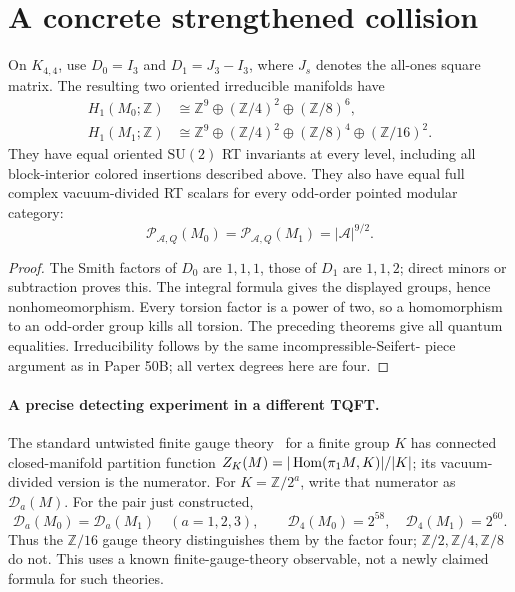 \section{A concrete strengthened collision}
\begin{corollary}
On \(K_{4,4}\), use \(D_0=I_3\) and \(D_1=J_3-I_3\), where
\(J_s\) denotes the all-ones square matrix. The resulting two
oriented irreducible manifolds have
\begin{align*}
 H_1(M_0;\mathbb Z)&\cong\mathbb Z^9\oplus(\mathbb Z/4)^2
                                  \oplus(\mathbb Z/8)^6,\\
 H_1(M_1;\mathbb Z)&\cong\mathbb Z^9\oplus(\mathbb Z/4)^2
                  \oplus(\mathbb Z/8)^4\oplus(\mathbb Z/16)^2.
\end{align*}
They have equal oriented \(\mathrm{SU}(2)\) RT invariants at every
level, including all block-interior colored insertions described above.
They also have equal full complex vacuum-divided RT scalars for every
odd-order pointed modular category:
\[
 \mathcal P_{\mathcal A,Q}(M_0)
 =\mathcal P_{\mathcal A,Q}(M_1)=|\mathcal A|^{9/2}.
\]
\end{corollary}
\begin{proof}
The Smith factors of \(D_0\) are \(1,1,1\), those of \(D_1\) are
\(1,1,2\); direct minors or subtraction proves this. The integral
formula gives the displayed groups, hence nonhomeomorphism. Every
torsion factor is a power of two, so a homomorphism to an odd-order
group kills all torsion. The preceding theorems give all quantum
equalities. Irreducibility follows by the same incompressible-Seifert-
piece argument as in Paper 50B; all vertex degrees here are four.
\end{proof}

\paragraph{A precise detecting experiment in a different TQFT.}
The standard untwisted finite gauge theory~\cite{dw} for a finite group \(K\)
has connected closed-manifold partition function
\(Z_K(M)=|\operatorname{Hom}(\pi_1M,K)|/|K|\); its vacuum-divided version is the
numerator. For \(K=\mathbb Z/2^a\), write that numerator as
\(\mathcal D_a(M)\). For the pair just constructed,
\[
 \mathcal D_a(M_0)=\mathcal D_a(M_1)\quad(a=1,2,3),\qquad
 \mathcal D_4(M_0)=2^{58},\quad\mathcal D_4(M_1)=2^{60}.
\]
Thus the \(\mathbb Z/16\) gauge theory distinguishes them by the
factor four; \(\mathbb Z/2,\mathbb Z/4,\mathbb Z/8\) do not.
This uses a known finite-gauge-theory observable, not a newly claimed
formula for such theories.

